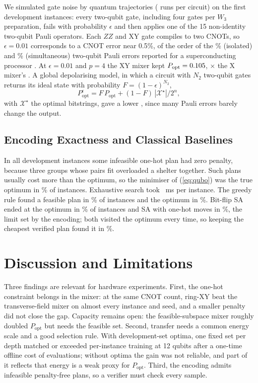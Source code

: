 \documentclass[conference]{IEEEtran}
\begin{document}
We simulated gate noise by quantum trajectories (\TrajRuns{} runs per circuit) on the first \TrajInst{} development instances: every two-qubit gate, including four gates per $W_3$ preparation, fails with probability $\epsilon$ and then applies one of the 15 non-identity two-qubit Pauli operators. Each $ZZ$ and XY gate compiles to two CNOTs, so $\epsilon=0.01$ corresponds to a CNOT error near 0.5\%, of the order of the \SycIso\% (isolated) and \SycSim\% (simultaneous) two-qubit Pauli errors reported for a superconducting processor \cite{Arute2019}. At $\epsilon=0.01$ and $p=4$ the XY mixer kept $P_{\mathrm{opt}}=0.105$, \TrajRatioOne$\times$ the X mixer's \TrajXOne. A global depolarising model, in which a circuit with $N_2$ two-qubit gates returns its ideal state with probability $F=(1-\epsilon)^{N_2}$,
\begin{equation}
P_{\mathrm{opt}}^{\epsilon}=F\,P_{\mathrm{opt}}+(1-F)\,|\mathcal{X}^\star|/2^{n},
\label{eq:noise}
\end{equation}
with $\mathcal{X}^\star$ the optimal bitstrings, gave a lower \TrajGlobXYOne, since many Pauli errors barely change the output.

\subsection{Encoding Exactness and Classical Baselines}
In all \ZeroPenInfeasAll{} development instances some infeasible one-hot plan had zero penalty, because three groups whose pairs fit overloaded a shelter together. Such plans usually cost more than the optimum, so the minimiser of (\ref{eq:qubo}) was the true optimum in \QuboExact\% of instances. Exhaustive search took \ExactMs~ms per instance. The greedy rule found a feasible plan in \GreedyFeas\% of instances and the optimum in \GreedyOpt\%. Bit-flip SA ended at the optimum in \SATunedOpt\% of instances and SA with one-hot moves in \SAohOpt\%, the limit set by the encoding; both visited the optimum every time, so keeping the cheapest verified plan found it in \SAohVer\%.

\section{Discussion and Limitations}
Three findings are relevant for hardware experiments. First, the one-hot constraint belongs in the mixer: at the same CNOT count, ring-XY beat the transverse-field mixer on almost every instance and seed, and a smaller penalty did not close the gap. Capacity remains open: the feasible-subspace mixer roughly doubled $P_{\mathrm{opt}}$ but needs the feasible set. Second, transfer needs a common energy scale and a good selection rule. With development-set optima, one fixed set per depth matched or exceeded per-instance training at 12 qubits after a one-time offline cost of \OffTotal{} evaluations; without optima the gain was not reliable, and part of it reflects that energy is a weak proxy for $P_{\mathrm{opt}}$. Third, the encoding admits infeasible penalty-free plans, so a verifier must check every sample.
\end{document}
